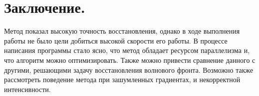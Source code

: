 \documentclass[oneside, final, 14pt]{extreport}
\begin{document}
\chapter{Заключение.}
Метод показал высокую точность восстановления, однако в ходе выполнения работы не было цели добиться высокой скорости его работы. В процессе написания программы стало ясно, что метод обладает ресурсом параллелизма и, что алгоритм можно оптимизировать. Также можно привести сравнение данного с другими, решающими задачу восстановления волнового фронта. Возможно также рассмотреть поведение метода при зашумленных градиентах, и некорректной интенсивности.
\end{document}
